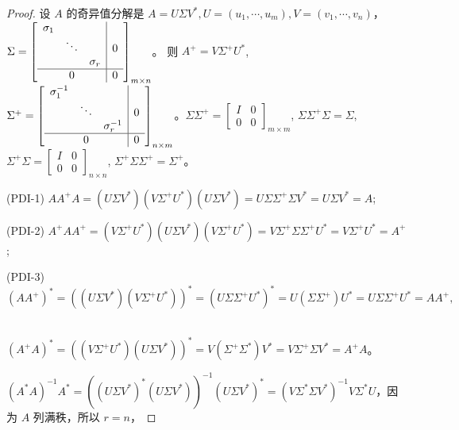 \documentclass[lang=cn,a4paper,newtx,bibend=bibtex]{elegantpaper}
\begin{document}
\begin{proof}
  设 $A$ 的奇异值分解是 $A = U\Sigma V^*, U = (u_1, \cdots, u_m), V = (v_1, \cdots, v_n)$，
  $\Sigma = \begin{bmatrix}
    \begin{array}{ccc|c}
      \sigma_1 & & & \\
      & \ddots & & 0 \\
      & & \sigma_r & \\
      \hline
      & 0 & & 0 \\
    \end{array}
  \end{bmatrix}_{m\times n}
  $。
  则 $A^+ = V\Sigma^+U^*$, 
  $\Sigma^+ = \begin{bmatrix}
    \begin{array}{ccc|c}
      \sigma_1^{-1} & & & \\
      & \ddots & & 0 \\
      & & \sigma_r^{-1} & \\
      \hline
      & 0 & & 0 \\
    \end{array}
  \end{bmatrix}_{n\times m}
  $。$\Sigma\Sigma^+ = \begin{bmatrix}
    I & 0 \\ 0 & 0 
  \end{bmatrix}_{m\times m}$,
  $\Sigma\Sigma^+\Sigma = \Sigma$,
  $\Sigma^+\Sigma = \begin{bmatrix}
    I & 0 \\ 0 & 0 
  \end{bmatrix}_{n\times n}$,
  $\Sigma^+\Sigma\Sigma^+ = \Sigma^+$。

  (PDI-1) $AA^+A = (U\Sigma V^*)(V\Sigma^+ U^*)(U\Sigma V^*) = U\Sigma\Sigma^+\Sigma V^* = U\Sigma V^* = A$;
  
  (PDI-2) $A^+AA^+ = (V\Sigma^+U^*)(U\Sigma V^*)(V\Sigma^+U^*) = V\Sigma^+\Sigma\Sigma^+ U^* = V\Sigma^+U^* = A^+$;

  (PDI-3) $(AA^+)^* = ((U\Sigma V^*)(V\Sigma^+U^*))^* = (U\Sigma\Sigma^+U^*)^* = U(\Sigma\Sigma^+)U^* = U\Sigma\Sigma^+U^* = AA^+,$
          
  ~~~~~~~~~~~~~~$(A^+A)^* = ((V\Sigma^+U^*)(U\Sigma V^*))^* = V(\Sigma^+\Sigma^*)V^* = V\Sigma^+\Sigma V^* = A^+A$。

  $(A^*A)^{-1}A^* = ((U\Sigma V^*)^*(U\Sigma V^*))^{-1}(U\Sigma V^*)^* = (V\Sigma^*\Sigma V^*)^{-1}V\Sigma^* U$，因为 $A$ 列满秩，所以 $r = n$，
  

\end{proof}
\end{document}
